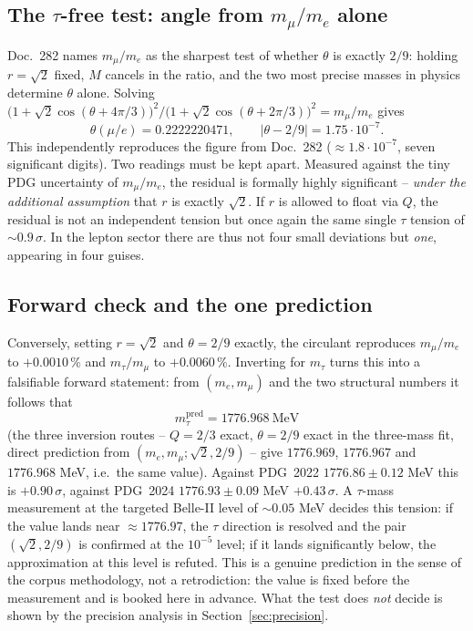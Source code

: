 \subsection{The $\tau$-free test: angle from $m_\mu/m_e$ alone}
Doc.~282 names $m_\mu/m_e$ as the sharpest test of whether $\theta$ is
exactly $2/9$: holding $r=\sqrt2$ fixed, $M$ cancels in the ratio, and the
two most precise masses in physics determine $\theta$ alone. Solving
$\bigl(1+\sqrt2\cos(\theta+4\pi/3)\bigr)^2/\bigl(1+\sqrt2\cos(\theta+2\pi/3)\bigr)^2
= m_\mu/m_e$ gives
\begin{equation}
  \theta(\mu/e) = 0.2222220471,\qquad |\theta-2/9| = 1.75\cdot10^{-7}.
\end{equation}
This independently reproduces the figure from Doc.~282
($\approx1.8\cdot10^{-7}$, seven significant digits). Two readings must be
kept apart. Measured against the tiny PDG uncertainty of $m_\mu/m_e$, the
residual is formally highly significant -- \emph{under the additional
assumption} that $r$ is exactly $\sqrt2$. If $r$ is allowed to float via
$Q$, the residual is not an independent tension but once again the same
single $\tau$ tension of $\sim0.9\,\sigma$. In the lepton sector there are
thus not four small deviations but \emph{one}, appearing in four guises.

\subsection{Forward check and the one prediction}
Conversely, setting $r=\sqrt2$ and $\theta=2/9$ exactly, the circulant
reproduces $m_\mu/m_e$ to $+0.0010\,\%$ and $m_\tau/m_\mu$ to
$+0.0060\,\%$. Inverting for $m_\tau$ turns this into a falsifiable forward
statement: from $(m_e, m_\mu)$ and the two structural numbers it follows that
\begin{equation}
  m_\tau^{\text{pred}} = 1776.968\ \text{MeV}
\end{equation}
(the three inversion routes -- $Q=2/3$ exact, $\theta=2/9$ exact in the
three-mass fit, direct prediction from $(m_e,m_\mu;\sqrt2,2/9)$ -- give
$1776.969$, $1776.967$ and $1776.968$ MeV, i.e.\ the same value). Against
PDG~2022 $1776.86\pm0.12$ MeV this is $+0.90\,\sigma$, against PDG~2024
$1776.93\pm0.09$ MeV $+0.43\,\sigma$. A $\tau$-mass measurement
at the targeted Belle-II level of $\sim0.05$ MeV decides this tension: if
the value lands near $\approx1776.97$, the $\tau$ direction is resolved and
the pair $(\sqrt2, 2/9)$ is confirmed at the $10^{-5}$ level; if it lands
significantly below, the approximation at this level is refuted. This is a
genuine prediction in the sense of the corpus methodology, not a
retrodiction: the value is fixed before the measurement and is booked here
in advance. What the test does \emph{not} decide is shown by the precision
analysis in Section~\ref{sec:precision}.

